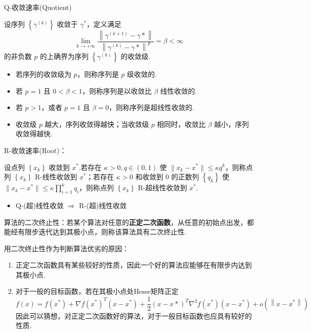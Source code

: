 \begin{remark}
    Q-收敛速率(Quotient)

    设序列 $\left\{\gamma^{(k)}\right\}$ 收敛于 $\gamma^*$，定义满足 \[\lim _{k \rightarrow+\infty} \frac{\left\|\gamma^{(k+1)}-\gamma *\right\|}{\left\|\gamma^{(k)}-\gamma *\right\|^{p}}=\beta<\infty\] 的非负数 $p$ 的上确界为序列 $\left\{\gamma^{(k)}\right\}$ 的收敛级.
    \begin{itemize}
        \item 若序列的收敛级为 $p$，则称序列是 $p$ 级收敛的.
        \item 若 $p = 1$ 且 $0 < \beta < 1$，则称序列是以收敛比 $\beta$ 线性收敛的.
        \item 若 $p > 1$，或者 $p = 1$ 且 $\beta = 0$，则称序列是超线性收敛的.
        \item 收敛级 $p$ 越大，序列收敛得越快；当收敛级 $p$ 相同时，收敛比 $\beta$ 越小，序列收敛得越快.
    \end{itemize}
\end{remark}

\begin{remark}
    R-收敛速率(Root)：

    设点列 $\left\{x_k\right\}$ 收敛到 $x^*$.若存在 $\kappa>0, q \in(0,1)$ 使 $\|x_k - x^*\| \le \kappa q^k$，则称点列 $\left\{x_k\right\}$ R-线性收敛到 $x^*$；若存在 $\kappa > 0$ 和收敛到 $0$ 的正数列 $\left\{q_k\right\}$ 使 $\|x_k - x^*\| \le \kappa \prod_{i = 1}^k q_i$，则称点列 $\left\{x_k\right\}$ R-超线性收敛到 $x^*$.

    \begin{itemize}
        \item Q-(超)线性收敛 $\Longrightarrow$ R-(超)线性收敛
    \end{itemize}
\end{remark}

\begin{remark}
    算法的二次终止性：若某个算法对任意的\textbf{正定二次函数}，从任意的初始点出发，都能经有限步迭代达到其极小点，则称该算法具有二次终止性.
    
    用二次终止性作为判断算法优劣的原因：
    \begin{enumerate}
        \item 正定二次函数具有某些较好的性质，因此一个好的算法应能够在有限步内达到其极小点.
        \item 对于一般的目标函数，若在其极小点处Hesse矩阵正定\[f(x) =f\left(x^{*}\right)+\nabla f\left(x^{*}\right)^{T}\left(x-x^{*}\right) 
        +\frac{1}{2}(x-x *)^{T} \nabla^{2} f\left(x^{*}\right)\left(x-x^{*}\right)+o\left(\left\|x-x^{*}\right\|\right)\]
        因此可以猜想，对正定二次函数好的算法，对于一般目标函数也应具有较好的性质.
    \end{enumerate}
\end{remark}

